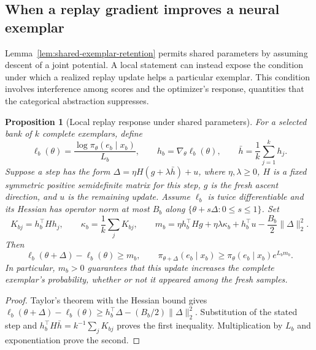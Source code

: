 \documentclass{article}
\newcommand{\enforcehalffinalproseline}{%
  \setlength{\parfillskip}{0pt plus .20\linewidth}}
\newcommand{\1}{\mathbf 1}
\newtheorem{proposition}[lemma]{Proposition}
\theoremstyle{remark}
\theoremstyle{definition}
\theoremstyle{plain}
\begin{document}
\subsection{When a replay gradient improves a neural exemplar}
\label{app:theory-neural-replay-response}

Lemma~\ref{lem:shared-exemplar-retention} permits shared parameters by
assuming descent of a joint potential. A local statement can instead expose
the condition under which a realized replay update helps a particular
exemplar. This condition involves interference among scores and the optimizer's
response, quantities that the categorical abstraction suppresses.

\begin{proposition}[Local replay response under shared parameters]
\enforcehalffinalproseline
\label{prop:neural-replay-local-response}
For a selected bank of $k$ complete exemplars, define
\[
 \ell_b(\theta)=\frac{\log\pi_\theta(e_b\mid x_b)}{L_b},\qquad
 h_b=\nabla_\theta\ell_b(\theta),\qquad
 \bar h=\frac1k\sum_{j=1}^k h_j.
\]
Suppose a step has the form
$\Delta=\eta H(g+\lambda\bar h)+u$, where $\eta,\lambda\ge0$,
$H$ is a fixed symmetric positive semidefinite matrix for this step,
$g$ is the fresh ascent direction, and $u$ is the remaining update.
Assume $\ell_b$ is twice differentiable and its Hessian has operator norm
at most $B_b$ along $\{\theta+s\Delta:0\le s\le1\}$.
Set
\[
 K_{bj}=h_b^\top Hh_j,\qquad
 \kappa_b=\frac1k\sum_jK_{bj},\qquad
 m_b=\eta h_b^\top Hg+\eta\lambda\kappa_b
       +h_b^\top u-\frac{B_b}{2}\|\Delta\|_2^2.
\]
Then
\begin{equation}
 \ell_b(\theta+\Delta)-\ell_b(\theta)\ge m_b,
 \qquad
 \pi_{\theta+\Delta}(e_b\mid x_b)
    \ge\pi_\theta(e_b\mid x_b)e^{L_bm_b}.
 \label{eq:neural-replay-local-response}
\end{equation}
In particular, $m_b>0$ guarantees that this update increases the complete
exemplar's probability, whether or not it appeared among the fresh samples.
\end{proposition}

\begin{proof}
\enforcehalffinalproseline
Taylor's theorem with the Hessian bound gives
$\ell_b(\theta+\Delta)-\ell_b(\theta)
 \ge h_b^\top\Delta-(B_b/2)\|\Delta\|_2^2$.
Substitution of the stated step and
$h_b^\top H\bar h=k^{-1}\sum_jK_{bj}$ proves the first inequality.
Multiplication by $L_b$ and exponentiation prove the second.
\end{proof}
\end{document}
